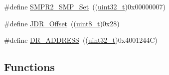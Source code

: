 \begin{DoxyCompactItemize}
\item 
\#define \hyperlink{group___a_d_c___private___defines_ga6555beb1970c42125678d80530bba4d3}{S\+M\+P\+R2\+\_\+\+S\+M\+P\+\_\+\+Set}~((\hyperlink{_p_e___types_8h_a33594304e786b158f3fb30289278f5af}{uint32\+\_\+t})0x00000007)
\item 
\#define \hyperlink{group___a_d_c___private___defines_ga5671a68d6f0d01c6c465ee7a3a8f3eea}{J\+D\+R\+\_\+\+Offset}~((\hyperlink{_p_e___types_8h_aba7bc1797add20fe3efdf37ced1182c5}{uint8\+\_\+t})0x28)
\item 
\#define \hyperlink{group___a_d_c___private___defines_ga35ecb1c96cfae175f5f00490e5e91e88}{D\+R\+\_\+\+A\+D\+D\+R\+E\+SS}~((\hyperlink{_p_e___types_8h_a33594304e786b158f3fb30289278f5af}{uint32\+\_\+t})0x4001244\+C)
\end{DoxyCompactItemize}
\subsection*{Functions}
